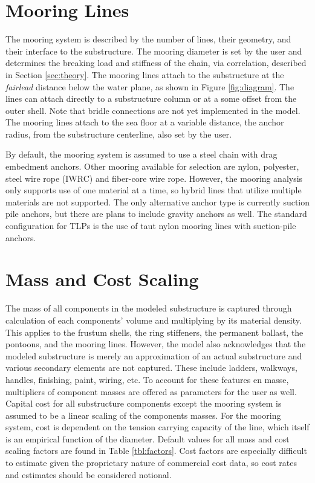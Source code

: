 \section{Mooring Lines}
The mooring system is described by the number of lines, their geometry,
and their interface to the substructure.  The mooring diameter is set by
the user and determines the breaking load and stiffness of the chain,
via correlation, described in Section \ref{sec:theory}.  The mooring
lines attach to the substructure at the \textit{fairlead} distance below
the water plane, as shown in Figure \ref{fig:diagram}.  The lines can
attach directly to a substructure column or at a some offset from the
outer shell.  Note that bridle connections are not yet implemented in
the model.  The mooring lines attach to the sea floor at a variable
distance, the anchor radius, from the substructure centerline, also set
by the user.

By default, the mooring system is assumed to use a steel chain with drag
embedment anchors. Other mooring available for selection are nylon,
polyester, steel wire rope (IWRC) and fiber-core wire rope.  However,
the mooring analysis only supports use of one material at a time, so
hybrid lines that utilize multiple materials are not supported.  The only
alternative anchor type is currently suction pile anchors, but there are
plans to include gravity anchors as well.  The standard configuration
for TLPs is the use of taut nylon mooring lines with suction-pile
anchors.

\section{Mass and Cost Scaling}
The mass of all components in the modeled substructure is captured
through calculation of each components' volume and multiplying by its material
density.  This applies to the frustum shells, the ring stiffeners, the
permanent ballast, the pontoons, and the mooring lines.
However, the model also acknowledges that the modeled substructure is
merely an approximation of an actual substructure and various secondary
elements are not captured.  These include ladders, walkways, handles,
finishing, paint, wiring, etc.  To account for these features en masse,
multipliers of component masses are offered as parameters for the user
as well.  Capital cost for all substructure components except the
mooring system is assumed to be a linear scaling of the components
masses.  For the mooring system, cost is dependent on the tension
carrying capacity of the line, which itself is an empirical function of
the diameter.  Default values for all mass and cost scaling factors are
found in Table \ref{tbl:factors}.  Cost factors are especially difficult to
estimate given the proprietary nature of commercial cost data, so
cost rates and estimates should be considered notional.

